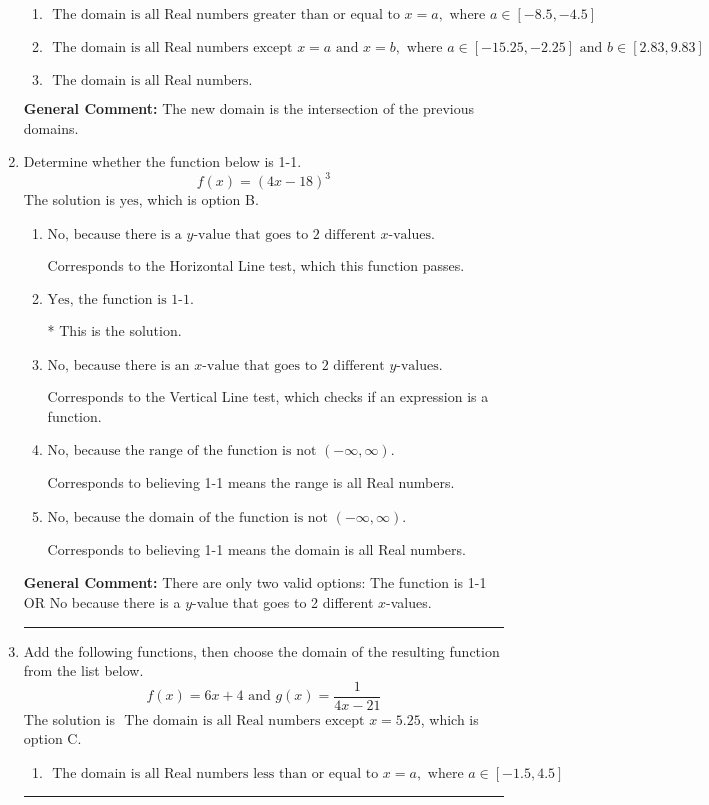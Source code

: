 \documentclass{extbook}[14pt]
\newcommand{\litem}[1]{\item #1

\rule{\textwidth}{0.4pt}}
\begin{document}
\begin{enumerate}
{\begin{enumerate}[label=\Alph*.]
\item \( \text{ The domain is all Real numbers greater than or equal to } x = a, \text{ where } a \in [-8.5, -4.5] \)


\item \( \text{ The domain is all Real numbers except } x = a \text{ and } x = b, \text{ where } a \in [-15.25, -2.25] \text{ and } b \in [2.83, 9.83] \)


\item \( \text{ The domain is all Real numbers. } \)


\end{enumerate}

\textbf{General Comment:} The new domain is the intersection of the previous domains.
}
\litem{
Determine whether the function below is 1-1.
\[ f(x) = (4 x - 18)^3 \]The solution is \( \text{yes} \), which is option B.\begin{enumerate}[label=\Alph*.]
\item \( \text{No, because there is a $y$-value that goes to 2 different $x$-values.} \)

Corresponds to the Horizontal Line test, which this function passes.
\item \( \text{Yes, the function is 1-1.} \)

* This is the solution.
\item \( \text{No, because there is an $x$-value that goes to 2 different $y$-values.} \)

Corresponds to the Vertical Line test, which checks if an expression is a function.
\item \( \text{No, because the range of the function is not $(-\infty, \infty)$.} \)

Corresponds to believing 1-1 means the range is all Real numbers.
\item \( \text{No, because the domain of the function is not $(-\infty, \infty)$.} \)

Corresponds to believing 1-1 means the domain is all Real numbers.
\end{enumerate}

\textbf{General Comment:} There are only two valid options: The function is 1-1 OR No because there is a $y$-value that goes to 2 different $x$-values.
}
\litem{
Add the following functions, then choose the domain of the resulting function from the list below.
\[ f(x) = 6x + 4 \text{ and } g(x) = \frac{1}{4x-21} \]The solution is \( \text{ The domain is all Real numbers except } x = 5.25 \), which is option C.\begin{enumerate}[label=\Alph*.]
\item \( \text{ The domain is all Real numbers less than or equal to } x = a, \text{ where } a \in [-1.5, 4.5] \)



\end{enumerate}}
\end{enumerate}
\end{document}
